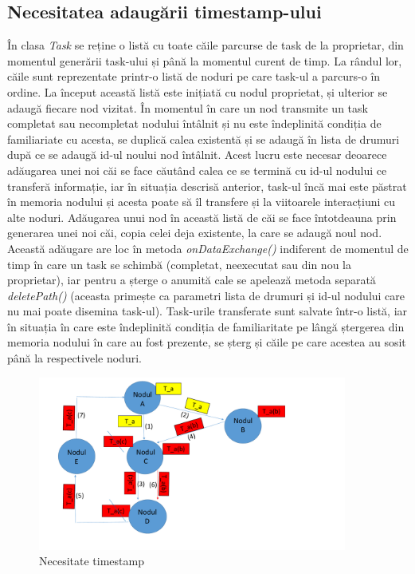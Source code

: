 \documentclass[12pt,a4paper]{report}
\begin{document}
\subsection{Necesitatea adaugării timestamp-ului}
În clasa \textit{Task} se reține o listă cu toate căile parcurse de task de la proprietar, din momentul generării task-ului și până la momentul curent de timp. La rândul lor, căile sunt reprezentate printr-o listă de noduri pe care task-ul a parcurs-o în ordine. La început această listă este inițiată cu nodul proprietat, și ulterior se adaugă fiecare nod vizitat. În momentul în care un nod transmite un task completat sau necompletat nodului întâlnit și nu este îndeplinită condiția de familiariate cu acesta, se duplică calea existentă și se adaugă în lista de drumuri după ce se adaugă id-ul noului nod întâlnit. Acest lucru este necesar deoarece adăugarea unei noi căi se face căutând calea ce se termină cu id-ul nodului ce transferă informație, iar în situația descrisă anterior, task-ul încă mai este păstrat în memoria nodului și acesta poate să îl transfere și la viitoarele interacțiuni cu alte noduri. Adăugarea unui nod în această listă de căi se face întotdeauna prin generarea unei noi căi, copia celei deja existente, la care se adaugă noul nod. Această adăugare are loc în metoda \textit{onDataExchange()} indiferent de momentul de timp în care un task se schimbă (completat, neexecutat sau din nou la proprietar), iar pentru a șterge o anumită cale se apelează metoda separată \textit{deletePath()} (aceasta primește ca parametri lista de drumuri și id-ul nodului care nu mai poate disemina task-ul). Task-urile transferate sunt salvate într-o listă, iar în situația în care este îndeplinită condiția de familiaritate pe lângă ștergerea din memoria nodului în care au fost prezente, se șterg și căile pe care acestea au sosit până la respectivele noduri.

\begin{figure}[th]
\centering
\includegraphics[width=4in]{pics/Timestamp.pdf}
  \caption[ca]{Necesitate timestamp}
  \label{fig:timestamp}
\end{figure}
\end{document}

